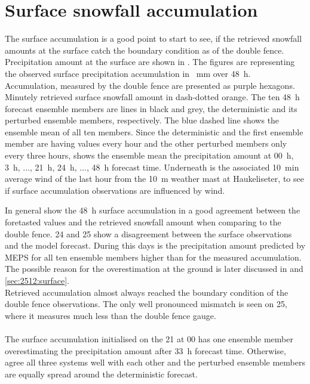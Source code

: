 \section{Surface snowfall accumulation}
The surface accumulation is a good point to start to see, if the retrieved snowfall amounts at the surface catch the boundary condition as of the double fence. Precipitation amount at the surface are shown in . The figures are representing the observed surface precipitation accumulation in \SI{}{\mm} over \SI{48}{\hour}. Accumulation, measured by the double fence are presented as purple hexagons. Minutely retrieved surface snowfall amount in dash-dotted orange. The ten \SI{48}{\hour} forecast ensemble members are lines in black and grey, the deterministic and its perturbed ensemble members, respectively. The blue dashed line shows the ensemble mean of all ten members. Since the deterministic and the first ensemble member are having values every hour and the other perturbed members only every three hours, shows the ensemble mean the precipitation amount at 0\SI{0}{\hour}, \SI{3}{\hour}, $\ldots$, \SI{21}{\hour}, \SI{24}{\hour}, $\ldots$, \SI{48}{\hour} forecast time. 
Underneath is the associated \SI{10}{\minute} average wind of the last hour from the \SI{10}{\metre} weather mast at Haukeliseter, to see if surface accumulation observations are influenced by wind. 

\noindent
In general show the \SI{48}{\hour} surface accumulation in  a good agreement between the foretasted values and the retrieved snowfall amount when comparing to the double fence. \SI{24}{\dec} and \SI{25}{\dec} show a disagreement between the surface observations and the model forecast. During this days is the precipitation amount predicted by MEPS for all ten ensemble members higher than for the measured accumulation. The possible reason for the overestimation at the ground is later discussed in  and \ref{sec:2512:surface}. \\
Retrieved accumulation almost always reached the boundary condition of the double fence observations. The only well pronounced mismatch is seen on \SI{25}{\dec}, where it measures much less than the double fence gauge.  
\\ \\
The surface accumulation initialised on the \SI{21}{\dec} at 0\SI{0}{\UTC} has one ensemble member overestimating the precipitation amount after \SI{33}{\hour} forecast time. Otherwise, agree all three systems well with each other and the perturbed ensemble members are equally spread around the deterministic forecast.

